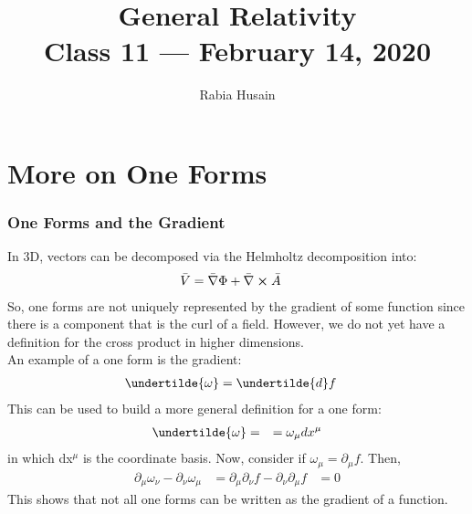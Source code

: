 \documentclass[11pt]{article}
\title{{\Huge General Relativity}\\{\Large{Class 11 --- February 14, 2020}}} %
\author{Rabia Husain}
\begin{document}
\maketitle
\flushbottom
\newpage
\pagestyle{fancynotes}

\part{More on One Forms}

    \section{One Forms and the Gradient}
    In 3D, vectors can be decomposed via the Helmholtz decomposition into:
        \begin{equation}
            \begin{aligned}
            \bar{V} &= \bar{\nabla} \Phi + \bar{\nabla} \cross \bar{A}
            \end{aligned}
        \end{equation}
    So, one forms are not uniquely represented by the gradient of some function since there is a component that is the curl of a field. However, we do not yet have a definition for the cross product in higher dimensions. \\
    An example of a one form is the gradient:
        \begin{equation}
            \begin{aligned}
            \undertilde{\omega} &= \undertilde{d}f
            \end{aligned}
        \end{equation}
    This can be used to build a more general definition for a one form:
        \begin{equation}
            \begin{aligned}
            \undertilde{\omega} &= &= \omega_\mu dx^\mu 
            \end{aligned}
        \end{equation}
    in which dx$^\mu$ is the coordinate basis.
    Now, consider if $\omega_\mu = \partial_\mu f$. Then,
        \begin{equation}
            \begin{aligned}
            \partial_\mu \omega_\nu - \partial_\nu \omega_\mu &= \partial_\mu \partial_\nu f - \partial_\nu \partial_\mu f &= 0
            \end{aligned}
        \end{equation}
    This shows that not all one forms can be written as the gradient of a function.
    
\end{document}

